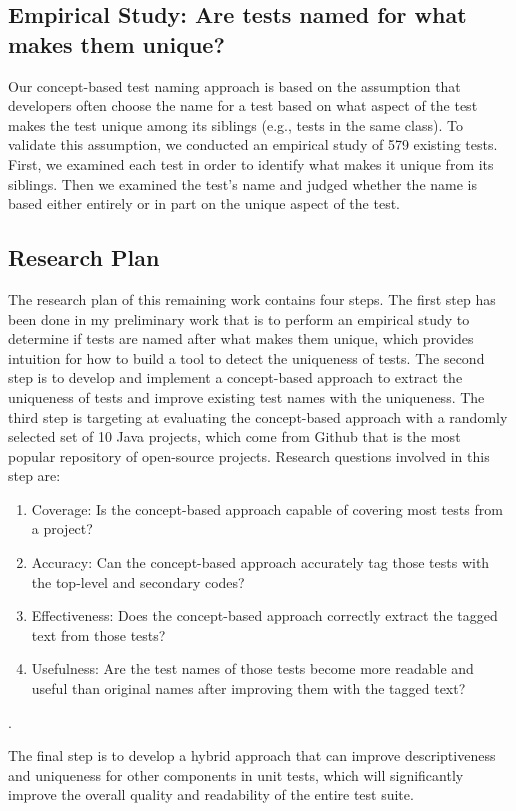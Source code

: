 \documentclass[proposal.tex]{subfiles}
\begin{document}
\subsection{Empirical Study: Are tests named for what makes them unique?}
\label{sec:unique-test-name}

Our concept-based test naming approach is based on the assumption that developers often choose the name for a test based on what aspect of the test makes the test unique among its siblings (e.g., tests in the same class).
%
To validate this assumption, we conducted an empirical study of \num{579} existing tests.
%
First, we examined each test in order to identify what makes it unique from its siblings.
%
Then we examined the test's name and judged whether the name is based either entirely or in part on the unique aspect of the test.

\subsection{Research Plan}

The research plan of this remaining work contains four steps.
%
The first step has been done in my preliminary work that is to perform an empirical study to determine if tests are named after what makes them unique, which provides intuition for how to build a tool to detect the uniqueness of tests.
%
The second step is to develop and implement a concept-based approach to extract the uniqueness of tests and improve existing test names with the uniqueness.
%
The third step is targeting at evaluating the concept-based approach with a randomly selected set of \num{10} Java projects, which come from Github that is the most popular repository of open-source projects.
%
Research questions involved in this step are:
\begin{enumerate}
    \item Coverage: Is the concept-based approach capable of covering most tests from a project?
    \item Accuracy: Can the concept-based approach accurately tag those tests with the top-level and secondary codes?
    \item Effectiveness: Does the concept-based approach correctly extract the tagged text from those tests?
    \item Usefulness: Are the test names of those tests become more readable and useful than original names after improving them with the tagged text?
\end{enumerate}.

The final step is to develop a hybrid approach that can improve descriptiveness and uniqueness for other components in unit tests, which will significantly improve the overall quality and readability of the entire test suite.
\end{document}
